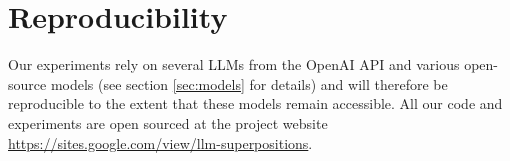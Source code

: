 \section*{Reproducibility}
Our experiments rely on several LLMs from the OpenAI API \citep{openai_api} and various open-source models (see section \ref{sec:models} for details) and will therefore be reproducible to the extent that these models remain accessible. All our code and experiments are open sourced at the project website  \url{https://sites.google.com/view/llm-superpositions}.



